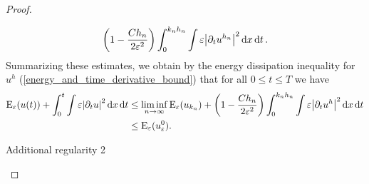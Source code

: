 \begin{proof}
\begin{description}[wide=0pt]
\begin{align*}
			\left( 1 - \frac{ C h_{ n } }{ 2 \varepsilon^{ 2 } } \right)
			\int_{ 0 }^{ k_{ n } h_{ n } }
			\int
			\varepsilon
			\abs{ \partial_{ t } u^{ h_{ n } } }^{ 2 }
			\dd{ x }
			\dd{ t }.		
		\end{align*}
		Summarizing these estimates, we obtain by the energy dissipation inequality for $ u^{ h } $ (\ref{energy_and_time_derivative_bound}) that for all $ 0 \leq t \leq T $ we have
		\begin{align*}
			\operatorname{E}_{ \varepsilon } ( u ( t ) )
			+
			\int_{ 0 }^{ t }
			\int
			\varepsilon
			\abs{ \partial_{ t } u }^{ 2 }
			\dd{ x }
			\dd{ t }
			& \leq
			\liminf_{ n \to \infty }
			\operatorname{E}_{ \varepsilon } ( u_{ k_{ n } } )
			+
			\left( 1 - \frac{ C h_{ n } }{ 2 \varepsilon^{ 2 } } \right)
			\int_{ 0 }^{ k_{ n } h_{ n } }
			\int
			\varepsilon
			\abs{ \partial_{ t } u^{ h } }^{ 2 }
			\dd{ x }
			\dd{ t }
			\\
			& \leq
			\operatorname{E}_{ \varepsilon } ( u_{ \varepsilon }^{ 0 } ).
		\end{align*}
		
		\item[Step 8:] Additional regularity 2
		

\end{description}
\end{proof}

